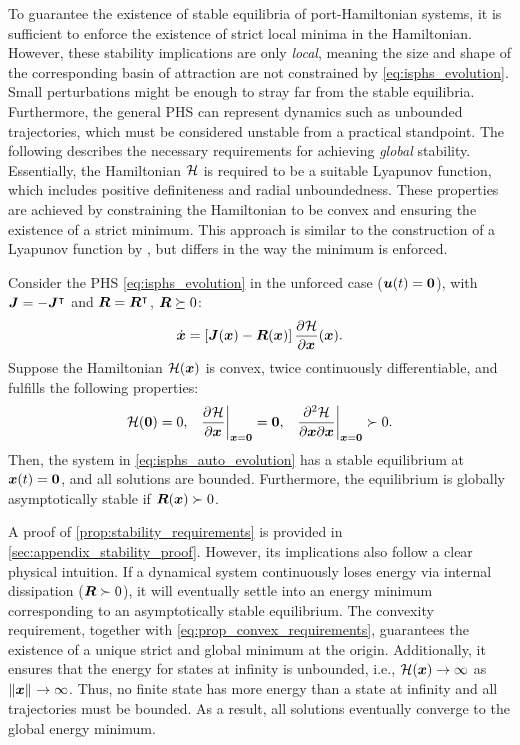 To guarantee the existence of stable equilibria of port-Hamiltonian systems, it is sufficient to enforce the existence of strict local minima in the Hamiltonian. However, these stability implications are only \emph{local}, meaning the size and shape of the corresponding basin of attraction are not constrained by \cref{eq:isphs_evolution}. Small perturbations might be enough to stray far from the stable equilibria. 
Furthermore, the general \gls{PHS} can represent dynamics such as unbounded trajectories, which must be considered unstable from a practical standpoint. 
The following describes the necessary requirements for achieving \emph{global} stability. 
Essentially, the Hamiltonian ${\mathcal{H}}$ is required to be a suitable Lyapunov function, which includes positive definiteness and radial unboundedness.
These properties are achieved by constraining the Hamiltonian to be convex and ensuring the existence of a strict minimum. This approach is similar to the construction of a Lyapunov function by \citet{kolter2019}, but differs in the way the minimum is enforced.
\begin{theorem}\label{prop:stability_requirements}
    Consider the \gls{PHS} \cref{eq:isphs_evolution} in the unforced case ($\boldsymbol{u}(t)=\boldsymbol{0}$), with $\boldsymbol{J}=-\boldsymbol{J}^{\intercal}$ and $\boldsymbol{R}=\boldsymbol{R}^{\intercal}$, $\boldsymbol{R}\succeq0$:
    \begin{equation}\label{eq:isphs_auto_evolution}
        \dot{\boldsymbol{x}} = \left[\boldsymbol{J}(\boldsymbol{x}) - \boldsymbol{R}(\boldsymbol{x})\right]\frac{\partial^{}{\mathcal{H}}}{\partial\boldsymbol{x}^{}}(\boldsymbol{x}).
    \end{equation}
    Suppose the Hamiltonian ${\mathcal{H}}(\boldsymbol{x})$ is convex, twice continuously differentiable, and fulfills the following properties:
    \begin{align}\label{eq:prop_convex_requirements}
        {\mathcal{H}}(\boldsymbol{0})=0,&&
        \frac{\partial^{}{\mathcal{H}}}{\partial\boldsymbol{x}^{}}\bigg\rvert_{\boldsymbol{x}=\boldsymbol{0}}=\boldsymbol{0},&&
        \frac{\partial^2{{\mathcal{H}}}}{\partial{\boldsymbol{x}}\partial{\boldsymbol{x}}}\bigg\rvert_{\boldsymbol{x}=\boldsymbol{0}}\succ0.
    \end{align}
    Then, the system in \cref{eq:isphs_auto_evolution} has a stable equilibrium at $\boldsymbol{x}(t)=\boldsymbol{0}$, and all solutions are bounded. Furthermore, the equilibrium is globally asymptotically stable if $\boldsymbol{R}(\boldsymbol{x})\succ0$.
\end{theorem}
A proof of \cref{prop:stability_requirements} is provided in \cref{sec:appendix_stability_proof}.
However, its implications also follow a clear physical intuition. 
If a dynamical system continuously loses energy via internal dissipation ($\boldsymbol{R}\succ0$), it will eventually settle into an energy minimum corresponding to an asymptotically stable equilibrium. The convexity requirement, together with \cref{eq:prop_convex_requirements}, guarantees the existence of a unique strict and global minimum at the origin. Additionally, it ensures that the energy for states at infinity is unbounded, i.e., ${\mathcal{H}}(\boldsymbol{x})\to\infty$ as $\left\lVert\boldsymbol{x}\right\rVert_{}\rightarrow\infty$. Thus, no finite state has more energy than a state at infinity and all trajectories must be bounded. As a result, all solutions eventually converge to the global energy minimum. 

